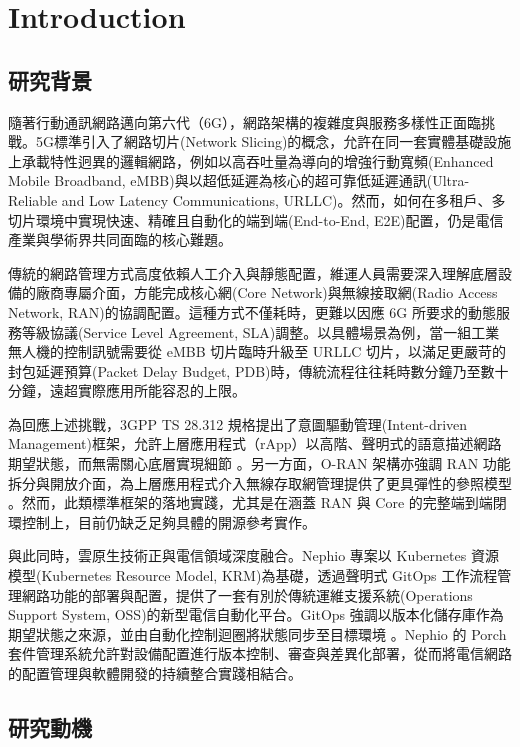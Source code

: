 \chapter{Introduction}
\label{ch:intro}


\section{研究背景}

隨著行動通訊網路邁向第六代（6G），網路架構的複雜度與服務多樣性正面臨挑戰。5G標準引入了網路切片(Network Slicing)的概念，允許在同一套實體基礎設施上承載特性迥異的邏輯網路，例如以高吞吐量為導向的增強行動寬頻(Enhanced Mobile Broadband, eMBB)與以超低延遲為核心的超可靠低延遲通訊(Ultra-Reliable and Low Latency Communications, URLLC)。然而，如何在多租戶、多切片環境中實現快速、精確且自動化的端到端(End-to-End, E2E)配置，仍是電信產業與學術界共同面臨的核心難題。

傳統的網路管理方式高度依賴人工介入與靜態配置，維運人員需要深入理解底層設備的廠商專屬介面，方能完成核心網(Core Network)與無線接取網(Radio Access Network, RAN)的協調配置。這種方式不僅耗時，更難以因應 6G 所要求的動態服務等級協議(Service Level Agreement, SLA)調整。以具體場景為例，當一組工業無人機的控制訊號需要從 eMBB 切片臨時升級至 URLLC 切片，以滿足更嚴苛的封包延遲預算(Packet Delay Budget, PDB)時，傳統流程往往耗時數分鐘乃至數十分鐘，遠超實際應用所能容忍的上限。

為回應上述挑戰，3GPP TS 28.312 規格提出了意圖驅動管理(Intent-driven Management)框架，允許上層應用程式（rApp）以高階、聲明式的語意描述網路期望狀態，而無需關心底層實現細節 \cite{3gpp_ts28312}。另一方面，O-RAN 架構亦強調 RAN 功能拆分與開放介面，為上層應用程式介入無線存取網管理提供了更具彈性的參照模型 \cite{oran_oad_r005}。然而，此類標準框架的落地實踐，尤其是在涵蓋 RAN 與 Core 的完整端到端閉環控制上，目前仍缺乏足夠具體的開源參考實作。

與此同時，雲原生技術正與電信領域深度融合。Nephio 專案以 Kubernetes 資源模型(Kubernetes Resource Model, KRM)為基礎，透過聲明式 GitOps 工作流程管理網路功能的部署與配置，提供了一套有別於傳統運維支援系統(Operations Support System, OSS)的新型電信自動化平台。GitOps 強調以版本化儲存庫作為期望狀態之來源，並由自動化控制迴圈將狀態同步至目標環境 \cite{cncf_gitops_2025}。Nephio 的 Porch 套件管理系統允許對設備配置進行版本控制、審查與差異化部署，從而將電信網路的配置管理與軟體開發的持續整合實踐相結合。

\section{研究動機}


